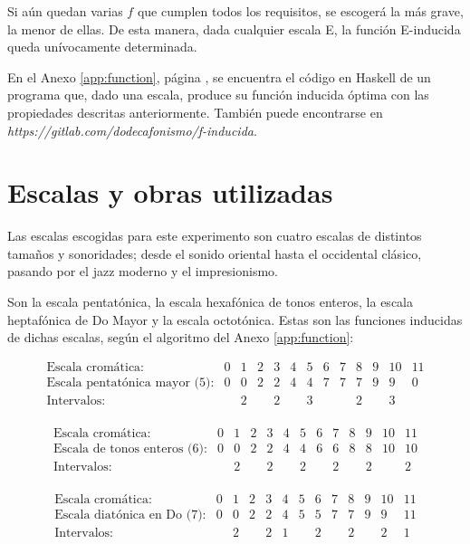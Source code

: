 		Si aún quedan varias $f$ que cumplen todos los requisitos, se escogerá la más grave, la menor de ellas. De esta manera, dada cualquier escala E, la función E-inducida queda unívocamente determinada.
		
		En el Anexo \ref{app:function}, página \pageref{app:function}, se encuentra el código en Haskell de un programa que, dado una escala, produce su función inducida óptima con las propiedades descritas anteriormente. También puede encontrarse en \textit{https://gitlab.com/dodecafonismo/f-inducida}.
		
	\section{Escalas y obras utilizadas}
	
		Las escalas escogidas para este experimento son cuatro escalas de distintos tamaños y sonoridades; desde el sonido oriental hasta el occidental clásico, pasando por el jazz moderno y el impresionismo.
		
		Son la escala pentatónica, la escala hexafónica de tonos enteros, la escala heptafónica de Do Mayor y la escala octotónica. Estas son las funciones inducidas de dichas escalas, según el algoritmo del Anexo \ref{app:function}:
	
		$$\left.\begin{matrix}
		\text{Escala cromática:}&0&1&2&3&4&5&6&7&8&9&10&11\\
		\text{Escala pentatónica mayor (5):}&0&0&2&2&4&4&7&7&7&9&9&0\\
		\text{Intervalos:}&&2&&2&&3&&&2&&3&\\
		\end{matrix}\right.$$
		
		$$\left.\begin{matrix}
		\text{Escala cromática:}&0&1&2&3&4&5&6&7&8&9&10&11\\
		\text{Escala de tonos enteros (6):}&0&0&2&2&4&4&6&6&8&8&10&10\\
		\text{Intervalos:}&&2&&2&&2&&2&&2&&2\\
		\end{matrix}\right.$$

        $$\left.\begin{matrix}
        \text{Escala cromática:}&0&1&2&3&4&5&6&7&8&9&10&11\\
        \text{Escala diatónica en Do (7):}&0&0&2&2&4&5&5&7&7&9&9&11\\
        \text{Intervalos:}&&2&&2&1&&2&&2&&2&1\\
        \end{matrix}\right.$$
        

